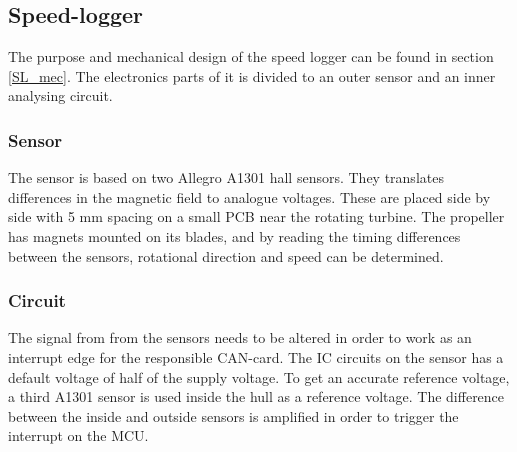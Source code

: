 \subsection{Speed-logger} %
\noindent
The purpose and mechanical design of the speed logger can be found in section \ref{SL_mec}. The electronics parts of it is divided to an outer sensor and an inner analysing circuit.

\subsubsection{Sensor}
\noindent
The sensor is based on two Allegro A1301 hall sensors. They translates differences in the magnetic field to analogue voltages. These are placed side by side with 5 mm spacing on a small PCB near the rotating turbine. 
The propeller has magnets mounted on its blades, and by reading the timing differences between the sensors, rotational direction and speed can be determined.

\subsubsection{Circuit}
\noindent
The signal from from the sensors needs to be altered in order to work as an interrupt edge for the responsible CAN-card.
The IC circuits on the sensor has a default voltage of half of the supply voltage.
To get an accurate reference voltage, a third A1301 sensor is used inside the hull as a reference voltage.
The difference between the inside and outside sensors is amplified in order to trigger the interrupt on the MCU. 

	
	
